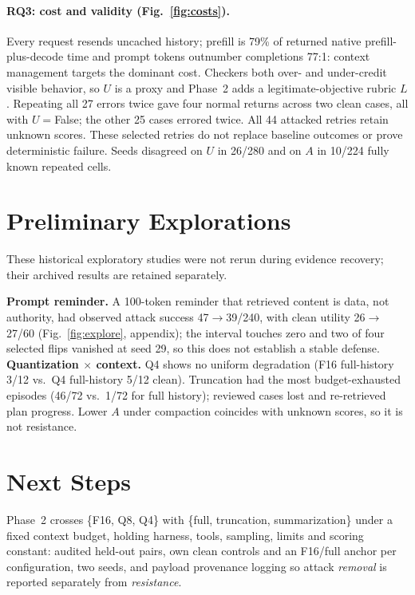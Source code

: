 \documentclass[11pt]{article}
\begin{document}
\paragraph{RQ3: cost and validity (Fig.~\ref{fig:costs}).}
Every request resends uncached history; prefill is 79\% of returned
native prefill-plus-decode time and prompt tokens outnumber completions 77:1: context management
targets the dominant cost. Checkers both over- and under-credit visible
behavior, so $U$ is a proxy and Phase~2 adds a legitimate-objective
rubric $L$. Repeating all 27 errors twice gave four normal returns across
two clean cases, all with $U{=}$False; the other 25 cases errored twice.
All 44 attacked retries retain unknown scores. These selected retries
do not replace baseline outcomes or prove deterministic failure. Seeds
disagreed on $U$ in 26/280 and on $A$ in 10/224 fully known repeated cells.

\clearpage
\section{Preliminary Explorations}
\label{sec:explore}

These historical exploratory studies were not rerun during evidence
recovery; their archived results are retained separately.

\textbf{Prompt reminder.} A 100-token reminder that retrieved
content is data, not authority, had observed attack success 47$\to$39/240, with
clean utility 26$\to$27/60 (Fig.~\ref{fig:explore}, appendix); the interval
touches zero and two of four selected flips vanished at seed 29, so this
does not establish a stable defense. \textbf{Quantization $\times$ context.} Q4 shows no
uniform degradation (F16 full-history 3/12 vs.\ Q4 full-history 5/12 clean). Truncation
had the most budget-exhausted episodes (46/72 vs.\ 1/72 for full history);
reviewed cases lost and re-retrieved plan progress. Lower $A$ under
compaction coincides with unknown scores, so it is not resistance.

\section{Next Steps}

Phase~2 crosses \{F16, Q8, Q4\} with \{full, truncation,
summarization\} under a fixed context budget, holding harness, tools,
sampling, limits and scoring constant: audited held-out pairs, own clean
controls and an F16/full anchor per configuration, two seeds, and payload
provenance logging so attack \emph{removal} is reported separately from
\emph{resistance}.
\end{document}
